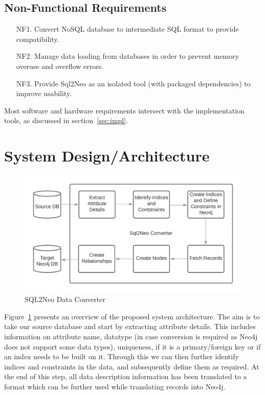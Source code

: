 \documentclass[12pt]{article}
\newcommand{\sectionfontstyle}{\fontsize{16pt}{1em}\usefont{T1}{phv}{b}{n}}
\begin{document}
    \subsection{Non-Functional Requirements}
    \begin{enumerate}
        \item [NF1.] Convert NoSQL database to intermediate SQL format to provide compatibility.
        \item [NF2.] Manage data loading from databases in order to prevent memory overuse and overflow errors.
        \item [NF3.] Provide Sql2Neo as an isolated tool (with packaged dependencies) to improve usability.
    \end{enumerate}

    Most software and hardware requirements intersect with the implementation tools, as discussed in section~\ref{sec:impl}.

    \newpage

    \section{\sectionfontstyle System Design/Architecture}
    \label{sec:sys_arch}
    \begin{figure}[htb!]
        \centering
        \includegraphics[width=155mm]{img/sql2neo_converter.png}
        \caption{SQL2Neo Data Converter}
        \label{fig:sql2neo_converter}
    \end{figure}

    Figure~\ref{fig:sql2neo_converter} presents an overview of the proposed system architecture. The aim is to take our source database and start by extracting attribute details. This includes information on attribute name, datatype (in case conversion is required as Neo4j does not support some data types), uniqueness, if it is a primary/foreign key or if an index needs to be built on it. Through this we can then further identify indices and constraints in the data, and subsequently define them as required. At the end of this step, all data description  information has been translated to a format which can be further used while translating records into Neo4j.
\end{document}
